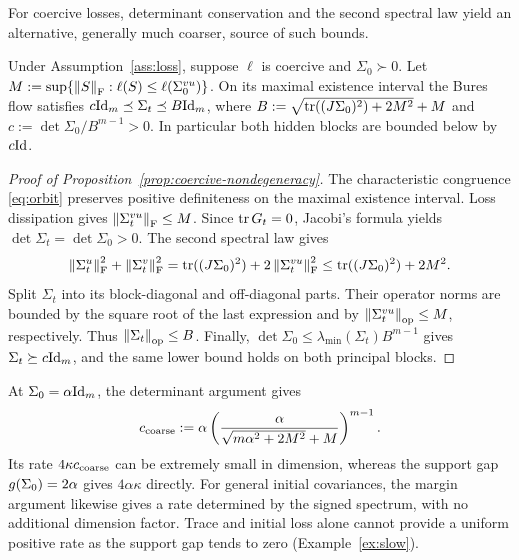 For coercive losses, determinant conservation and the second spectral
law yield an alternative, generally much coarser, source of such bounds.
\begin{proposition}
\label{prop:coercive-nondegeneracy}
Under Assumption~\ref{ass:loss}, suppose $\ell$ is coercive and
$\Sigma_0\succ0$. Let $M:=\sup\{\left\lVert S \right\rVert_{\mathrm{F}}:\ell(S)\le\ell(\Sigma^{vu}_0)\}$.
On its maximal existence interval the Bures flow satisfies
$c\mathrm{Id}_m\preceq\Sigma_t\preceq B\mathrm{Id}_m$, where
$B:=\sqrt{\operatorname{tr}((J\Sigma_0)^2)+2M^2}+M$ and
$c:=\det\Sigma_0/B^{m-1}>0$.
In particular both hidden blocks are bounded below by $c\mathrm{Id}$.
\end{proposition}

\begin{proof}[Proof of Proposition~\ref{prop:coercive-nondegeneracy}]
The characteristic congruence \eqref{eq:orbit} preserves positive
definiteness on the maximal existence interval. Loss dissipation gives
$\left\lVert \Sigma^{vu}_t \right\rVert_{\mathrm{F}}\le M$. Since $\operatorname{tr} G_t=0$, Jacobi's formula yields
$\det\Sigma_t=\det\Sigma_0>0$. The second spectral law gives
\[
 \left\lVert \Sigma^u_t \right\rVert_{\mathrm{F}}^2+\left\lVert \Sigma^v_t \right\rVert_{\mathrm{F}}^2
 =\operatorname{tr}((J\Sigma_0)^2)+2\left\lVert \Sigma^{vu}_t \right\rVert_{\mathrm{F}}^2
 \le\operatorname{tr}((J\Sigma_0)^2)+2M^2.
\]
Split $\Sigma_t$ into its block-diagonal and off-diagonal parts. Their
operator norms are bounded by the square root of the last expression
and by $\left\lVert \Sigma^{vu}_t \right\rVert_{\mathrm{op}}\le M$, respectively. Thus
$\left\lVert \Sigma_t \right\rVert_{\mathrm{op}}\le B$. Finally,
$\det\Sigma_0\le\lambda_{\min}(\Sigma_t)B^{m-1}$ gives
$\Sigma_t\succeq c\mathrm{Id}_m$, and the same lower bound holds on both
principal blocks.
\end{proof}

\begin{remark}
\label{rem:coarse-rate}
At $\Sigma_0=\alpha\mathrm{Id}_m$, the determinant argument gives
\[
c_{\rm coarse}
:=\alpha\left(\frac{\alpha}
{\sqrt{m\alpha^2+2M^2}+M}\right)^{m-1}.
\]
Its rate $4\kappa c_{\rm coarse}$ can be extremely small in dimension,
whereas the support gap $g(\Sigma_0)=2\alpha$ gives $4\alpha\kappa$ directly.
For general initial covariances, the margin argument likewise gives a
rate determined by the signed spectrum, with no additional dimension factor.
Trace and initial loss alone cannot provide a uniform positive rate as
the support gap tends to zero
(Example~\ref{ex:slow}).
\end{remark}

